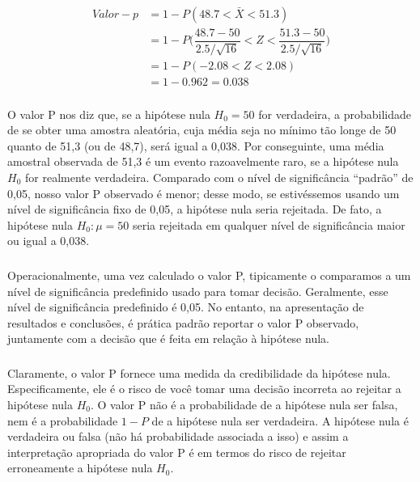 \documentclass[14pt,aspectratio=1610]{beamer}
\newcommand{\Ho}{\ensuremath{H_{0}}}
\begin{document}
\begin{frame}{}
\frametitle{}
\begin{block}{}
\justifying
\begin{align*}
Valor-p&=1-P(48.7<\bar{X}<51.3)\\
&=1-P\Biggl(\dfrac{48.7-50}{2.5/\sqrt{16}}<Z<\dfrac{51.3-50}{2.5/\sqrt{16}}\Biggl)\\
&=1-P(-2.08<Z<2.08)\\
&=1-0.962=0.038
\end{align*}
\end{block}
\end{frame}

\begin{frame}{}
\frametitle{}
\begin{block}{}
\justifying
O valor P nos diz que, se a hipótese nula $\Ho = 50$ for verdadeira, a probabilidade de se obter uma amostra aleatória, cuja média seja no mínimo tão longe de 50 
quanto de 51,3 (ou de 48,7), será igual a 0,038. Por conseguinte, uma média amostral observada de 51,3 é um evento razoavelmente raro, se a hipótese nula 
$\Ho$ for realmente verdadeira. Comparado com o nível de significância ``padrão'' de 0,05, nosso valor P observado é menor; desse modo, se estivéssemos usando 
um nível de significância fixo de 0,05, a hipótese nula seria rejeitada. De fato, a hipótese nula $\Ho:\mu = 50$ seria rejeitada em qualquer nível de significância maior 
ou igual a 0,038.
\end{block}
\end{frame}

\begin{frame}{}
\frametitle{}
\begin{block}{}
\justifying
Operacionalmente, uma vez calculado o valor P, tipicamente o comparamos a um nível de significância predefinido usado para tomar decisão. Geralmente, esse nível 
de significância predefinido é 0,05. No entanto, na apresentação de resultados e conclusões, é prática padrão reportar o valor P observado, juntamente com a decisão 
que é feita em relação à hipótese nula.
\end{block}
\end{frame}

\begin{frame}{}
\frametitle{}
\begin{block}{}
\justifying
Claramente, o valor P fornece uma medida da credibilidade da hipótese nula. Especificamente, ele é o risco de você tomar uma decisão incorreta ao rejeitar a hipótese 
nula $\Ho$. O valor P não é a probabilidade de a hipótese nula ser falsa, nem é a probabilidade $1 - P$ de a hipótese nula ser verdadeira. A hipótese nula é verdadeira 
ou falsa (não há probabilidade associada a isso) e assim a interpretação apropriada do valor P é em termos do risco de rejeitar erroneamente a hipótese nula $\Ho$. 
\end{block}
\end{frame}
\end{document}
